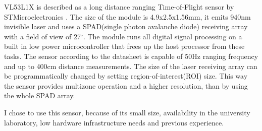 VL53L1X is described as a long distance ranging Time-of-Flight sensor by STMicroelectronics \cite{VL53L1XDatasheet}. 
The size of the module is 4.9x2.5x1.56mm, it emits 940nm invisible laser and uses a SPAD(single photon 
avalanche diode) receiving array with a field of view of 27$^{\circ}$. The module runs all digital signal
processing on a built in low power microcontroller that frees up the host processor from these tasks.
The sensor according to the datasheet is capable of 50Hz ranging frequency and up to 400cm distance 
measurements. The size of the laser receiving array can be programmatically changed by setting 
region-of-interest(ROI) size. This way the sensor provides multizone operation and a higher resolution, than
by using the whole SPAD array.

I chose to use this sensor, because of its small size, availability in the university laboratory, low hardware 
infrastructure needs and previous experience. 

